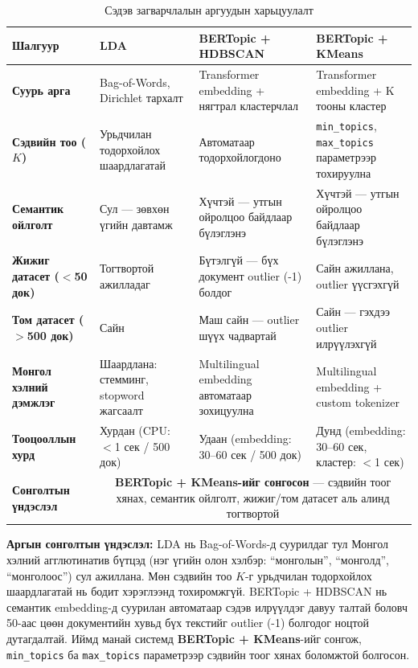 \begin{table}[h!]
\centering
\renewcommand{\arraystretch}{1.5}
\caption{Сэдэв загварчлалын аргуудын харьцуулалт}
\label{tab:topic_comparison}
\begin{tabular}{|p{3.2cm}|p{3.8cm}|p{3.8cm}|p{3.8cm}|}
\hline
\textbf{Шалгуур} & \textbf{LDA} & \textbf{BERTopic + HDBSCAN} & \textbf{BERTopic + KMeans} \\ \hline

\textbf{Суурь арга} &
Bag-of-Words, Dirichlet тархалт &
Transformer embedding + нягтрал кластерчлал &
Transformer embedding + K тооны кластер \\ \hline

\textbf{Сэдвийн тоо ($K$)} &
Урьдчилан тодорхойлох шаардлагатай &
Автоматаар тодорхойлогдоно &
\texttt{min\_topics}, \texttt{max\_topics} параметрээр тохируулна \\ \hline

\textbf{Семантик ойлголт} &
Сул — зөвхөн үгийн давтамж &
Хүчтэй — утгын ойролцоо байдлаар бүлэглэнэ &
Хүчтэй — утгын ойролцоо байдлаар бүлэглэнэ \\ \hline

\textbf{Жижиг датасет ($<$50 док)} &
Тогтвортой ажилладаг &
Бүтэлгүй — бүх документ outlier (-1) болдог &
Сайн ажиллана, outlier үүсгэхгүй \\ \hline

\textbf{Том датасет ($>$500 док)} &
Сайн &
Маш сайн — outlier шүүх чадвартай &
Сайн — гэхдээ outlier илрүүлэхгүй \\ \hline

\textbf{Монгол хэлний дэмжлэг} &
Шаардлана: стемминг, stopword жагсаалт &
Multilingual embedding автоматаар зохицуулна &
Multilingual embedding + custom tokenizer \\ \hline

\textbf{Тооцооллын хурд} &
Хурдан (CPU: $<$1 сек / 500 док) &
Удаан (embedding: 30--60 сек / 500 док) &
Дунд (embedding: 30--60 сек, кластер: $<$1 сек) \\ \hline

\textbf{Сонголтын үндэслэл} &
\multicolumn{3}{c|}{\cellcolor{green!10}\textbf{BERTopic + KMeans-ийг сонгосон} — сэдвийн тоог хянах, семантик ойлголт, жижиг/том датасет аль алинд тогтвортой} \\ \hline

\end{tabular}
\end{table}

\textbf{Аргын сонголтын үндэслэл:} LDA нь Bag-of-Words-д суурилдаг тул Монгол хэлний агглютинатив бүтцэд (нэг үгийн олон хэлбэр: ``монголын'', ``монголд'', ``монголоос'') сул ажиллана. Мөн сэдвийн тоо $K$-г урьдчилан тодорхойлох шаардлагатай нь бодит хэрэглээнд тохиромжгүй. BERTopic + HDBSCAN нь семантик embedding-д суурилан автоматаар сэдэв илрүүлдэг давуу талтай боловч 50-аас цөөн документийн хувьд бүх текстийг outlier (-1) болгодог ноцтой дутагдалтай. Иймд манай системд \textbf{BERTopic + KMeans}-ийг сонгож, \texttt{min\_topics} ба \texttt{max\_topics} параметрээр сэдвийн тоог хянах боломжтой болгосон.


